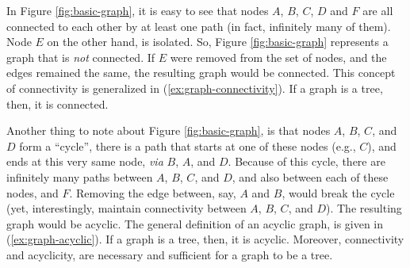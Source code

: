 \begin{exe}
	\label{ex:graph-path}
\end{exe}

In Figure \ref{fig:basic-graph}, it is easy to see that nodes $A$, $B$, $C$, $D$ and $F$ are all connected to each other by at least one path (in fact, infinitely many of them). Node $E$ on the other hand, is isolated. So, Figure \ref{fig:basic-graph} represents a graph that is \textit{not} connected. If $E$ were removed from the set of nodes, and the edges remained the same, the resulting graph would be connected. This concept of connectivity is generalized in (\ref{ex:graph-connectivity}). If a graph is a tree, then, it is connected.
\begin{exe}
	\label{ex:graph-connectivity}
\end{exe}

Another thing to note about Figure \ref{fig:basic-graph}, is that nodes $A$, $B$, $C$, and $D$ form a ``cycle'', there is a path that starts at one of these nodes (e.g., $C$), and ends at this very same node, \textit{via} $B$, $A$, and $D$. Because of this cycle, there are infinitely many paths between $A$, $B$, $C$, and $D$, and also between each of these nodes, and $F$. Removing the edge between, say, $A$ and $B$, would break the cycle (yet, interestingly, maintain connectivity between $A$, $B$, $C$, and $D$). The resulting graph would be acyclic. The general definition of an acyclic graph, is given in (\ref{ex:graph-acyclic}). If a graph is a tree, then, it is acyclic. Moreover, connectivity and acyclicity, are necessary and sufficient for a graph to be a tree.

\begin{exe}
	\label{ex:graph-acyclic}
\end{exe}

